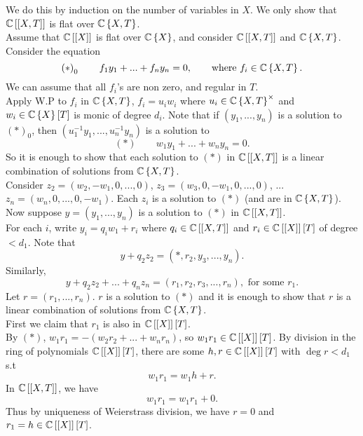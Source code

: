 We do this by induction on the number of variables in $X$. We only
show that $\mathbb{C}\left[\left[X,T\right]\right]$ is flat over $\mathbb{C}\left\{ X,T\right\} $.\\
Assume that $\mathbb{C}\left[\left[X\right]\right]$ is flat over $\mathbb{C}\left\{ X\right\} $,
and consider $\mathbb{C}\left[\left[X,T\right]\right]$ and $\mathbb{C}\left\{ X,T\right\} $.
\\
Consider the equation 
\[
\left(\ast\right)_{0}\qquad f_{1}y_{1}+...+f_{n}y_{n}=0,\qquad\textrm{where }f_{i}\in\mathbb{C}\left\{ X,T\right\} .
\]
We can assume that all $f_{i}$'s are non zero, and regular in $T$.
\\
Apply W.P to $f_{i}$ in $\mathbb{C}\left\{ X,T\right\} $, $f_{i}=u_{i}w_{i}$
where $u_{i}\in\mathbb{C}\left\{ X,T\right\} ^{\times}$ and $w_{i}\in\mathbb{C}\left\{ X\right\} \left[T\right]$
is monic of degree $d_{i}$. Note that if $\left(y_{1},...,y_{n}\right)$
is a solution to $\left(\ast\right)_{0}$, then $\left(u_{1}^{-1}y_{1},...,u_{n}^{-1}y_{n}\right)$
is a solution to 
\[
\left(\ast\right)\qquad w_{1}y_{1}+...+w_{n}y_{n}=0.
\]
So it is enough to show that each solution to $\left(\ast\right)$
in $\mathbb{C}\left[\left[X,T\right]\right]$ is a linear combination of solutions
from $\mathbb{C}\left\{ X,T\right\} $.\\
Consider $z_{2}=\left(w_{2},-w_{1},0,...,0\right)$, $z_{3}=\left(w_{3},0,-w_{1},0,...,0\right)$,
... $z_{n}=\left(w_{n},0,...,0,-w_{1}\right)$. Each $z_{i}$ is a
solution to $\left(\ast\right)$ (and are in $\mathbb{C}\left\{ X,T\right\} $).\\
Now suppose $y=\left(y_{1},...,y_{n}\right)$ is a solution to $\left(\ast\right)$
in $\mathbb{C}\left[\left[X,T\right]\right]$. \\
For each $i$, write $y_{i}=q_{i}w_{1}+r_{i}$ where $q_{i}\in\mathbb{C}\left[\left[X,T\right]\right]$
and $r_{i}\in\mathbb{C}\left[\left[X\right]\right]\left[T\right]$ of degree
$<d_{1}$. Note that
\[
y+q_{2}z_{2}=\left(\ast,r_{2},y_{3},...,y_{n}\right).
\]
Similarly,
\[
y+q_{2}z_{2}+...+q_{n}z_{n}=\left(r_{1},r_{2},r_{3},...,r_{n}\right),\textrm{ for some }r_{1}.
\]
Let $r=\left(r_{1},...,r_{n}\right)$. $r$ is a solution to $\left(\ast\right)$
and it is enough to show that $r$ is a linear combination of solutions
from $\mathbb{C}\left\{ X,T\right\} $.\\
First we claim that $r_{1}$ is also in $\mathbb{C}\left[\left[X\right]\right]\left[T\right]$.\\
By $\left(\ast\right)$, $w_{1}r_{1}=-\left(w_{2}r_{2}+...+w_{n}r_{n}\right)$,
so $w_{1}r_{1}\in\mathbb{C}\left[\left[X\right]\right]\left[T\right]$. By
division in the ring of polynomials $\mathbb{C}\left[\left[X\right]\right]\left[T\right]$,
there are some $h,r\in\mathbb{C}\left[\left[X\right]\right]\left[T\right]$
with $\deg r<d_{1}$ s.t 
\[
w_{1}r_{1}=w_{1}h+r.
\]
In $\mathbb{C}\left[\left[X,T\right]\right]$, we have
\[
w_{1}r_{1}=w_{1}r_{1}+0.
\]
Thus by uniqueness of Weierstrass division, we have $r=0$ and $r_{1}=h\in\mathbb{C}\left[\left[X\right]\right]\left[T\right]$. 


